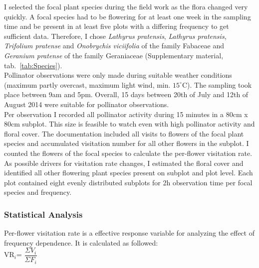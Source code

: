 I selected the focal plant species during the field work as the flora changed very quickly. A focal species had to be flowering for at least one week in the sampling time and be present in at least five plots with a differing frequency to get sufficient data. Therefore, I chose \textit{Lathyrus pratensis}, \textit{Lathyrus pratensis}, \textit{Trifolium pratense} and \textit{Onobrychis viciifolia} of the family Fabaceae and \textit{Geranium pratense} of the family Geraniaceae (Supplementary material, tab.~\ref{tab:Species}).\\

Pollinator observations were only made during suitable weather conditions (maximum partly overcast, maximum light wind, min. $15 ^\circ\text{C}$). The sampling took place between 9am and 5pm. Overall, 15 days between 20th of July and 12th of August 2014 were suitable for pollinator observations.\\

Per observation I recorded all pollinator activity during 15 minutes in a 80cm x 80cm subplot. This size is feasible to watch even with high pollinator activity and floral cover. The documentation included all visits to flowers of the focal plant species and accumulated visitation number for all other flowers in the subplot. I counted the flowers of the focal species to calculate the per-flower visitation rate. As possible drivers for visitation rate changes, I estimated the floral cover and identified all other flowering plant species present on subplot and plot level. Each plot contained eight evenly distributed subplots for 2h observation time per focal species and frequency. \\


\subsubsection*{Statistical Analysis}

Per-flower visitation rate is a effective response variable for analyzing the effect of frequency dependence. It is calculated as followed:\\


VR$_{\textit{i}}$= $\dfrac{\Sigma V_{\textit{i}}}{\Sigma F_{\textit{i}}}$
\\

